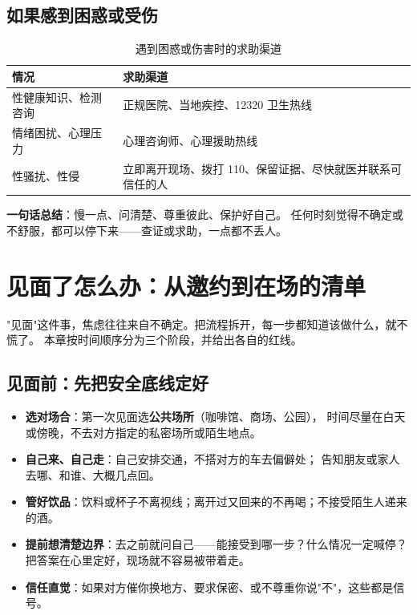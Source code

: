 \section{如果感到困惑或受伤}

\begin{table}[htbp]
  \centering
  \caption{遇到困惑或伤害时的求助渠道}
  \begin{tabularx}{\textwidth}{@{}l X@{}}
    \toprule
    \textbf{情况} & \textbf{求助渠道} \\
    \midrule
    性健康知识、检测咨询 & 正规医院、当地疾控、12320 卫生热线 \\
    情绪困扰、心理压力 & 心理咨询师、心理援助热线 \\
    性骚扰、性侵 & 立即离开现场、拨打 110、保留证据、尽快就医并联系可信任的人 \\
    \bottomrule
  \end{tabularx}
\end{table}

\noindent\textbf{一句话总结}：慢一点、问清楚、尊重彼此、保护好自己。
任何时刻觉得不确定或不舒服，都可以停下来——查证或求助，一点都不丢人。

\chapter{见面了怎么办：从邀约到在场的清单}
\label{chap:meeting}

"见面"这件事，焦虑往往来自不确定。把流程拆开，每一步都知道该做什么，就不慌了。
本章按时间顺序分为三个阶段，并给出各自的红线。

\section{见面前：先把安全底线定好}

\begin{itemize}[leftmargin=2em]
  \item \textbf{选对场合}：第一次见面选\textbf{公共场所}（咖啡馆、商场、公园），
        时间尽量在白天或傍晚，不去对方指定的私密场所或陌生地点。
  \item \textbf{自己来、自己走}：自己安排交通，不搭对方的车去偏僻处；
        告知朋友或家人去哪、和谁、大概几点回。
  \item \textbf{管好饮品}：饮料或杯子不离视线；离开过又回来的不再喝；不接受陌生人递来的酒。
  \item \textbf{提前想清楚边界}：去之前就问自己——能接受到哪一步？什么情况一定喊停？
        把答案在心里定好，现场就不容易被带着走。
  \item \textbf{信任直觉}：如果对方催你换地方、要求保密、或不尊重你说"不"，这些都是信号。
\end{itemize}

